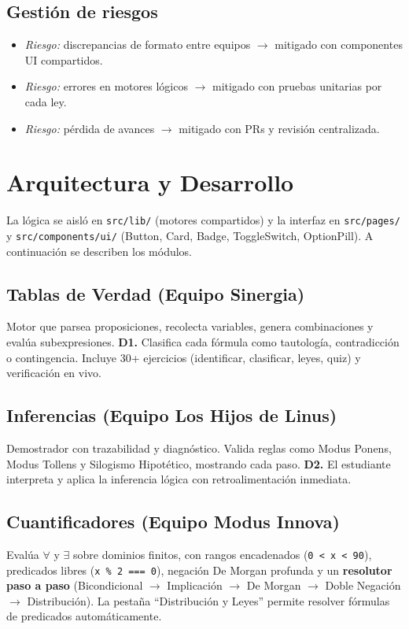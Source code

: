 \documentclass[12pt,a4paper]{article}
\begin{document}
\subsection{Gestión de riesgos}
\begin{itemize}
  \item \textit{Riesgo:} discrepancias de formato entre equipos $\to$ mitigado con componentes UI compartidos.
  \item \textit{Riesgo:} errores en motores lógicos $\to$ mitigado con pruebas unitarias por cada ley.
  \item \textit{Riesgo:} pérdida de avances $\to$ mitigado con PRs y revisión centralizada.
\end{itemize}

\section{Arquitectura y Desarrollo}
La lógica se aisló en \texttt{src/lib/} (motores compartidos) y la interfaz en \texttt{src/pages/} y
\texttt{src/components/ui/} (Button, Card, Badge, ToggleSwitch, OptionPill). A continuación se
describen los módulos.

\subsection{Tablas de Verdad (Equipo Sinergia)}
Motor que parsea proposiciones, recolecta variables, genera combinaciones y evalúa subexpresiones.
\textbf{D1.} Clasifica cada fórmula como tautología, contradicción o contingencia. Incluye 30+
ejercicios (identificar, clasificar, leyes, quiz) y verificación en vivo.

\subsection{Inferencias (Equipo Los Hijos de Linus)}
Demostrador con trazabilidad y diagnóstico. Valida reglas como Modus Ponens, Modus Tollens y
Silogismo Hipotético, mostrando cada paso. \textbf{D2.} El estudiante interpreta y aplica la
inferencia lógica con retroalimentación inmediata.

\subsection{Cuantificadores (Equipo Modus Innova)}
Evalúa $\forall$ y $\exists$ sobre dominios finitos, con rangos encadenados (\texttt{0 < x < 90}),
predicados libres (\texttt{x \% 2 === 0}), negación De Morgan profunda y un \textbf{resolutor paso a
paso} (Bicondicional $\to$ Implicación $\to$ De Morgan $\to$ Doble Negación $\to$ Distribución). La
pestaña ``Distribución y Leyes'' permite resolver fórmulas de predicados automáticamente.
\end{document}

